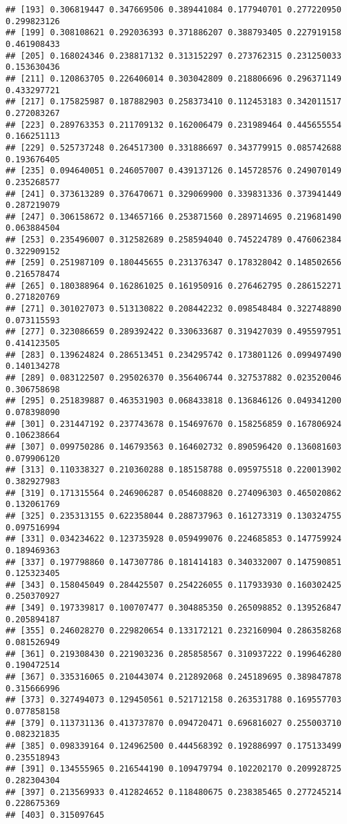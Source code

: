 \documentclass[
]{article}
\begin{document}
\begin{verbatim}
## [193] 0.306819447 0.347669506 0.389441084 0.177940701 0.277220950 0.299823126
## [199] 0.308108621 0.292036393 0.371886207 0.388793405 0.227919158 0.461908433
## [205] 0.168024346 0.238817132 0.313152297 0.273762315 0.231250033 0.153630436
## [211] 0.120863705 0.226406014 0.303042809 0.218806696 0.296371149 0.433297721
## [217] 0.175825987 0.187882903 0.258373410 0.112453183 0.342011517 0.272083267
## [223] 0.289763353 0.211709132 0.162006479 0.231989464 0.445655554 0.166251113
## [229] 0.525737248 0.264517300 0.331886697 0.343779915 0.085742688 0.193676405
## [235] 0.094640051 0.246057007 0.439137126 0.145728576 0.249070149 0.235268577
## [241] 0.373613289 0.376470671 0.329069900 0.339831336 0.373941449 0.287219079
## [247] 0.306158672 0.134657166 0.253871560 0.289714695 0.219681490 0.063884504
## [253] 0.235496007 0.312582689 0.258594040 0.745224789 0.476062384 0.322909152
## [259] 0.251987109 0.180445655 0.231376347 0.178328042 0.148502656 0.216578474
## [265] 0.180388964 0.162861025 0.161950916 0.276462795 0.286152271 0.271820769
## [271] 0.301027073 0.513130822 0.208442232 0.098548484 0.322748890 0.073115593
## [277] 0.323086659 0.289392422 0.330633687 0.319427039 0.495597951 0.414123505
## [283] 0.139624824 0.286513451 0.234295742 0.173801126 0.099497490 0.140134278
## [289] 0.083122507 0.295026370 0.356406744 0.327537882 0.023520046 0.306758698
## [295] 0.251839887 0.463531903 0.068433818 0.136846126 0.049341200 0.078398090
## [301] 0.231447192 0.237743678 0.154697670 0.158256859 0.167806924 0.106238664
## [307] 0.099750286 0.146793563 0.164602732 0.890596420 0.136081603 0.079906120
## [313] 0.110338327 0.210360288 0.185158788 0.095975518 0.220013902 0.382927983
## [319] 0.171315564 0.246906287 0.054608820 0.274096303 0.465020862 0.132061769
## [325] 0.235313155 0.622358044 0.288737963 0.161273319 0.130324755 0.097516994
## [331] 0.034234622 0.123735928 0.059499076 0.224685853 0.147759924 0.189469363
## [337] 0.197798860 0.147307786 0.181414183 0.340332007 0.147590851 0.125323405
## [343] 0.158045049 0.284425507 0.254226055 0.117933930 0.160302425 0.250370927
## [349] 0.197339817 0.100707477 0.304885350 0.265098852 0.139526847 0.205894187
## [355] 0.246028270 0.229820654 0.133172121 0.232160904 0.286358268 0.081526949
## [361] 0.219308430 0.221903236 0.285858567 0.310937222 0.199646280 0.190472514
## [367] 0.335316065 0.210443074 0.212892068 0.245189695 0.389847878 0.315666996
## [373] 0.327494073 0.129450561 0.521712158 0.263531788 0.169557703 0.077858158
## [379] 0.113731136 0.413737870 0.094720471 0.696816027 0.255003710 0.082321835
## [385] 0.098339164 0.124962500 0.444568392 0.192886997 0.175133499 0.235518943
## [391] 0.134555965 0.216544190 0.109479794 0.102202170 0.209928725 0.282304304
## [397] 0.213569933 0.412824652 0.118480675 0.238385465 0.277245214 0.228675369
## [403] 0.315097645
\end{verbatim}
\end{document}
